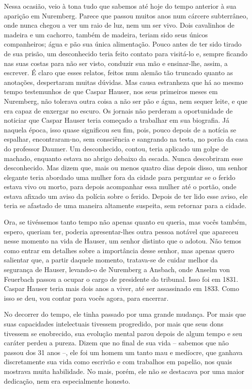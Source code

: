 Nessa ocasião, veio à tona tudo que sabemos até hoje do tempo anterior à
sua aparição em Nuremberg. Parece que passou muitos anos num cárcere
subterrâneo, onde nunca chegou a ver um raio de luz, nem um ser vivo.
Dois cavalinhos de madeira e um cachorro, também de madeira, teriam sido
seus únicos companheiros; água e pão sua única alimentação. Pouco antes
de ter sido tirado de sua prisão, um desconhecido teria feito contato
para visitá-lo e, sempre ficando nas suas costas para não ser visto,
conduzir sua mão e ensinar-lhe, assim, a escrever. É claro que esses
relatos, feitos num alemão tão truncado quanto as anotações, despertaram
muitas dúvidas. Mas causa estranheza que há ao mesmo tempo testemunhos
de que Caspar Hauser, nos seus primeiros meses em Nuremberg, não
tolerava outra coisa a não ser pão e água, nem sequer leite, e que era
capaz de enxergar no escuro. Os jornais não perderam a oportunidade de
noticiar que Caspar Hauser teria começado a trabalhar em sua biografia.
Já naquela época, isso quase significou seu fim, pois, pouco depois de a
notícia se espalhar, encontraram-no, sem consciência e sangrando na
testa, no porão da casa do professor Daumer. Um desconhecido, contou,
teria aplicado um golpe de machado, enquanto estava no abrigo debaixo da
escada. Nunca descobriram esse desconhecido. Mas dizem que, mais ou
menos quatro dias depois disso, um senhor elegante teria abordado uma
mulher fora da cidade para perguntar se o ferido estava vivo ou morto,
para depois acompanhar essa mulher até o portão, onde estava afixado um
aviso da polícia sobre o ferido. Depois de ter lido esse aviso, ele
teria se afastado de uma maneira altamente suspeita, sem retornar para a
cidade.

Ora, se tivéssemos tanto tempo não apenas quanto eu queria, mas vocês
também, espero, queriam ter, poderia apresentar-lhes outra pessoa
notável que apareceu nesse momento na vida de Hauser, um senhor distinto
que o adotou. Não temos como entrar em detalhes sobre a importância
desse senhor, mas apenas quero salientar que, a partir daquele momento,
tratava-se de cuidar melhor da segurança de Hauser, levando-o de
Nuremberg a Ansbach, onde Anselm von Feuerbach passou a ocupar o cargo
de presidente do tribunal. Isso foi em 1831. Caspar Hauser teria mais
dois anos a viver, até ser assassinado em 1833. Como isso se deu, vou
contar para vocês agora, para encerrar.

No decorrer do tempo, ele tinha passado por uma grande mudança. Por mais
que suas capacidades intelectuais tivessem progredido, por mais que seus
dons tivessem se enobrecido, sua evolução mental parou depois de algum
tempo e seu caráter perdeu a pureza. Dizem que no final de sua vida --
sabemos que não passou dos 31 anos --, ele foi um homem um tanto mau e
medíocre, que ganhava discretamente sua vida como escrivão e com
trabalhos em papelão, nos quais mostrava muita habilidade. No mais,
porém, ele não se destacava por uma maior dedicação, nem era
especialmente honesto.

